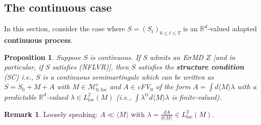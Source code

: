 \documentclass[12pt,a4paper, twoside]{article}
\newtheorem{prop}{Proposition}[section]
\theoremstyle{definition}
\newtheorem{rem}{Remark}[section]
\begin{document}
\subsection{The continuous case}
In this section, consider the case where $S=(S_t)_{0 \leq t \leq T}$ is an $\mathbb{R}^d$-valued adapted \textbf{continuous process}.
\begin{prop} \label{P52} Suppose $S$ is continuous. If $S$ admits an E$\sigma$MD $Z$ [and in particular, if $S$ satisfies (NFLVR)], then $S$ satisfies the \textbf{structure condition} (SC) i.e., $S$ is a continuous semimartingale which can be written as $S=S_0 + M + A$ with $M \in \mathcal{M}_{0, \text{loc}}^c$ and $A \in $cFV$_0$ of the form $A = \int d \langle M \rangle \lambda$ with a predictable $\mathbb{R}^d$-valued $\lambda \in L_\text{loc}^2(M)$ (i.e., $\int \lambda^\text{tr} d \langle M \rangle \lambda$ is finite-valued). 
\end{prop}
\begin{rem} Loosely speaking: $A \ll \langle M \rangle$ with $\lambda = \frac{dA}{d\langle M \rangle} \in L_\text{loc}^2(M)$.
\end{rem}
\newpage
\end{document}
